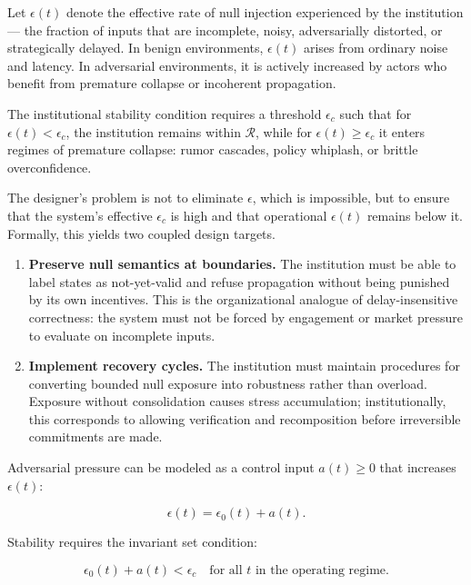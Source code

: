 \documentclass[11pt]{article}
\theoremstyle{remark}
\begin{document}
Let $\epsilon(t)$ denote the effective rate of null injection experienced by the institution --- the fraction of inputs that are incomplete, noisy, adversarially distorted, or strategically delayed. In benign environments, $\epsilon(t)$ arises from ordinary noise and latency. In adversarial environments, it is actively increased by actors who benefit from premature collapse or incoherent propagation.

The institutional stability condition requires a threshold $\epsilon_c$ such that for $\epsilon(t) < \epsilon_c$, the institution remains within $\mathcal{R}$, while for $\epsilon(t) \geq \epsilon_c$ it enters regimes of premature collapse: rumor cascades, policy whiplash, or brittle overconfidence.

The designer's problem is not to eliminate $\epsilon$, which is impossible, but to ensure that the system's effective $\epsilon_c$ is high and that operational $\epsilon(t)$ remains below it. Formally, this yields two coupled design targets.

\begin{enumerate}
  \item \textbf{Preserve null semantics at boundaries.} The institution must be able to label states as not-yet-valid and refuse propagation without being punished by its own incentives. This is the organizational analogue of delay-insensitive correctness: the system must not be forced by engagement or market pressure to evaluate on incomplete inputs.

  \item \textbf{Implement recovery cycles.} The institution must maintain procedures for converting bounded null exposure into robustness rather than overload. Exposure without consolidation causes stress accumulation; institutionally, this corresponds to allowing verification and recomposition before irreversible commitments are made.
\end{enumerate}

Adversarial pressure can be modeled as a control input $a(t) \geq 0$ that increases $\epsilon(t)$:

\[
\epsilon(t) = \epsilon_0(t) + a(t).
\]

Stability requires the invariant set condition:

\begin{equation}
\epsilon_0(t) + a(t) < \epsilon_c \quad \text{for all } t \text{ in the operating regime.}
\label{eq:governance}
\end{equation}
\end{document}
